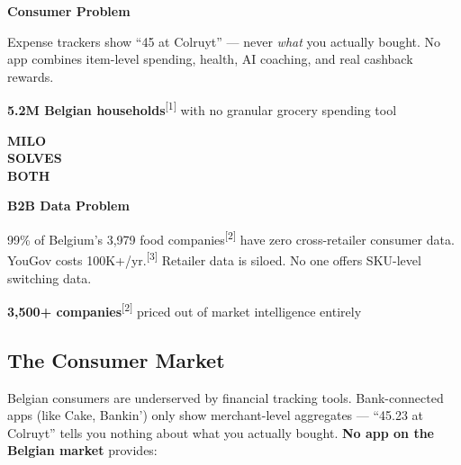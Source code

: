 \documentclass[11pt,a4paper]{article}
\begin{document}
\begin{premiumbox}
\begin{center}
\begin{minipage}[t]{0.42\textwidth}
\centering
{\color{milopurple!80}\fontsize{12}{14}\selectfont\bfseries Consumer Problem}

\vspace{0.4em}
{\footnotesize Expense trackers show ``\texteuro{}45 at Colruyt'' --- never \emph{what} you actually bought. No app combines item-level spending, health, AI coaching, and real cashback rewards.}

\vspace{0.3em}
{\color{milogray}\scriptsize\textbf{5.2M Belgian households}\textsuperscript{[1]} with no granular grocery spending tool}
\end{minipage}%
\hfill
\begin{minipage}[t]{0.1\textwidth}
\centering
\vspace{1.5em}
{\footnotesize\bfseries\color{milowarm}MILO\\SOLVES\\BOTH}
\end{minipage}%
\hfill
\begin{minipage}[t]{0.42\textwidth}
\centering
{\color{miloprimary}\fontsize{12}{14}\selectfont\bfseries B2B Data Problem}

\vspace{0.4em}
{\footnotesize 99\% of Belgium's 3,979 food companies\textsuperscript{[2]} have zero cross-retailer consumer data. YouGov costs \texteuro{}100K+/yr.\textsuperscript{[3]} Retailer data is siloed. No one offers SKU-level switching data.}

\vspace{0.3em}
{\color{milogray}\scriptsize\textbf{3,500+ companies}\textsuperscript{[2]} priced out of market intelligence entirely}
\end{minipage}
\end{center}
\end{premiumbox}

\subsection{The Consumer Market}

Belgian consumers are underserved by financial tracking tools. Bank-connected apps (like Cake, Bankin') only show merchant-level aggregates --- ``\texteuro{}45.23 at Colruyt'' tells you nothing about what you actually bought. \textbf{No app on the Belgian market} provides:
\end{document}
